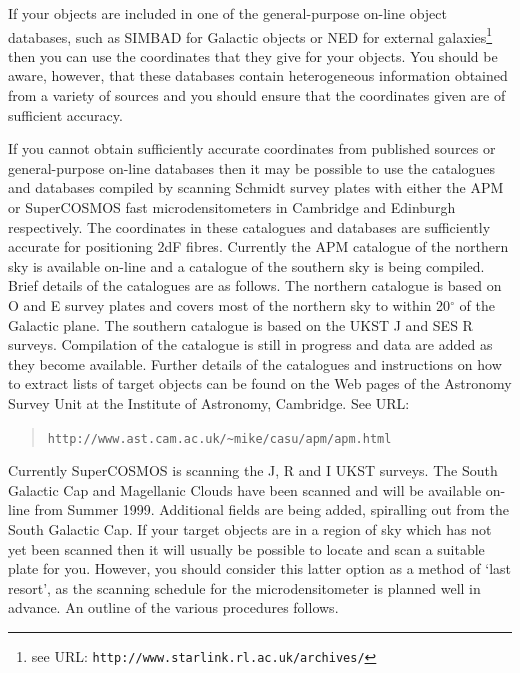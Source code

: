 \documentclass[twoside,11pt]{article}
\newcommand{\htmladdnormallink}[2]{#1}
\begin{document}
If your objects are included in one of the general-purpose on-line object
databases, such as 
\htmladdnormallink{SIMBAD}{http://simbad.u-strasbg.fr/Simbad}
for Galactic objects or
\htmladdnormallink{NED}{http://nedwww.ipac.caltech.edu/}
for external galaxies\footnote{see URL:
\htmladdnormallink{ {\tt http://www.starlink.rl.ac.uk/archives/}}
{http://www.starlink.rl.ac.uk/archives/}} then you can
use the coordinates that they give for your objects.  You should be aware,
however, that these databases contain heterogeneous information obtained
from a variety of sources and you should ensure that the coordinates given
are of sufficient accuracy.

If you cannot obtain sufficiently accurate coordinates from published
sources or general-purpose on-line databases then it may be possible to
use the catalogues and databases compiled by scanning Schmidt survey
plates with either the APM or SuperCOSMOS fast microdensitometers in
Cambridge and Edinburgh respectively.  The coordinates in these catalogues
and databases are sufficiently accurate for positioning 2dF fibres.
Currently the APM catalogue of the northern sky is available on-line
and a catalogue of the southern sky is being compiled.  Brief details
of the catalogues are as follows.  The northern catalogue is based on
O and E survey plates and covers most of the northern sky to within
20$^{\circ}$ of the Galactic plane.  The southern catalogue is based on
the UKST J and SES R  surveys.  Compilation of the catalogue is still in
progress and data are added as they become available.  Further details
of the catalogues and instructions on how to extract lists of target
objects can be found on the Web pages of the 
\htmladdnormallink{Astronomy Survey Unit}
{http://www.ast.cam.ac.uk/\~{}mike/casu/} at the 
\htmladdnormallink{Institute of Astronomy}{http://www.ast.cam.ac.uk/},
Cambridge.  See URL:

\begin{quote}
\htmladdnormallink{ {\tt http://www.ast.cam.ac.uk/\~{}mike/casu/apm/apm.html}}
{http://www.ast.cam.ac.uk/\~{}mike/casu/apm/apm.html}
\end{quote}

Currently SuperCOSMOS is scanning the J, R and I UKST surveys.  The South
Galactic Cap and Magellanic Clouds have been scanned and will be available
on-line from Summer 1999.  Additional fields are being added, spiralling out
from the South Galactic Cap.  If your target objects are in a region of sky
which has not yet been scanned then it will usually be possible to locate and
scan a suitable plate for you.  However, you should consider this latter
option as a method of `last resort', as the scanning schedule for the
microdensitometer is planned well in advance.  An outline of the various
procedures follows.
\end{document}
